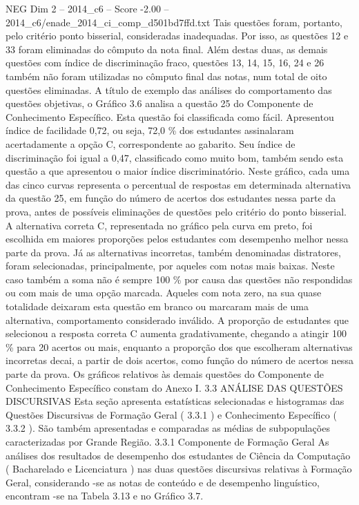 \begin{textsample}{NEG Dim 2 – 2014\_c6 – Score -2.00 – 2014\_c6/enade\_2014\_ci\_comp\_d501bd7ffd.txt}
Tais questões foram, portanto, pelo critério ponto bisserial, consideradas inadequadas.
Por isso, as questões 12 e 33 foram eliminadas do cômputo da nota final.
Além destas duas, as demais questões com índice de discriminação fraco, questões 13, 14, 15, 16, 24 e 26 também não foram utilizadas no cômputo final das notas, num total de oito questões eliminadas.
A título de exemplo das análises do comportamento das questões objetivas, o Gráfico 3.6 analisa a questão 25 do Componente de Conhecimento Específico.
Esta questão foi classificada como fácil.
Apresentou índice de facilidade 0,72, ou seja, 72,0 \% dos estudantes assinalaram acertadamente a opção C, correspondente ao gabarito.
Seu índice de discriminação foi igual a 0,47, classificado como muito bom, também sendo esta questão a que apresentou o maior índice discriminatório.
Neste gráfico, cada uma das cinco curvas representa o percentual de respostas em determinada alternativa da questão 25, em função do número de acertos dos estudantes nessa parte da prova, antes de possíveis eliminações de questões pelo critério do ponto bisserial.
A alternativa correta C, representada no gráfico pela curva em preto, foi escolhida em maiores proporções pelos estudantes com desempenho melhor nessa parte da prova.
Já as alternativas incorretas, também denominadas distratores, foram selecionadas, principalmente, por aqueles com notas mais baixas.
Neste caso também a soma não é sempre 100 \% por causa das questões não respondidas ou com mais de uma opção marcada.
Aqueles com nota zero, na sua quase totalidade deixaram esta questão em branco ou marcaram mais de uma alternativa, comportamento considerado inválido.
A proporção de estudantes que selecionou a resposta correta C aumenta gradativamente, chegando a atingir 100 \% para 20 acertos ou mais, enquanto a proporção dos que escolheram alternativas incorretas decai, a partir de dois acertos, como função do número de acertos nessa parte da prova.
Os gráficos relativos às demais questões do Componente de Conhecimento Específico constam do Anexo I. 3.3 ANÁLISE DAS QUESTÕES DISCURSIVAS Esta seção apresenta estatísticas selecionadas e histogramas das Questões Discursivas de Formação Geral ( 3.3.1 ) e Conhecimento Específico ( 3.3.2 ).
São também apresentadas e comparadas as médias de subpopulações caracterizadas por Grande Região. 3.3.1 Componente de Formação Geral As análises dos resultados de desempenho dos estudantes de Ciência da Computação ( Bacharelado e Licenciatura ) nas duas questões discursivas relativas à Formação Geral, considerando -se as notas de conteúdo e de desempenho linguístico, encontram -se na Tabela 3.13 e no Gráfico 3.7.

\end{textsample}

